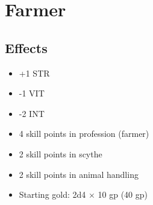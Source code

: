 \section{Farmer}\label{background:farmer}

\subsection*{Effects}
\begin{itemize}
    \item +1 STR
    \item -1 VIT
    \item -2 INT
    \item 4 skill points in profession (farmer)
    \item 2 skill points in scythe
    \item 2 skill points in animal handling
    \item Starting gold: 2d4 $\times$ 10 gp (40 gp)
\end{itemize}

